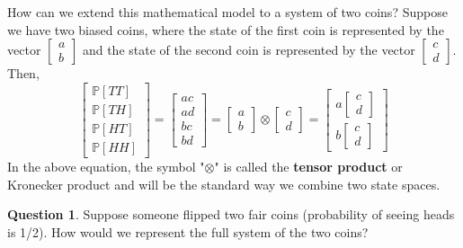 \documentclass[letterpaper, 12pt]{article}
\newcommand{\pr}{\mathbb{P}}	%
\newcommand{\1}{\mathds{1}}	%
\theoremstyle{definition}
\newtheorem{question}{Question}
\begin{document}
How can we extend this mathematical model to a system of two coins? Suppose we have two biased coins, where the state of the first coin is represented by the vector $\begin{bmatrix}
    a \\ b
\end{bmatrix}$ and the state of the second coin is represented by the vector $\begin{bmatrix}
    c \\ d
\end{bmatrix}$. Then, 
\begin{equation}
    \begin{bmatrix}
        \pr[TT] \\ \pr[TH] \\ \pr[HT] \\ \pr[HH] 
    \end{bmatrix} = \begin{bmatrix}
        ac \\ ad \\ bc \\ bd
    \end{bmatrix} = \begin{bmatrix}
        a \\ b
    \end{bmatrix} \otimes \begin{bmatrix}
        c \\ d
    \end{bmatrix} = \begin{bmatrix}
        a \begin{bmatrix}
            c \\ d
        \end{bmatrix} \\  b \begin{bmatrix}
            c \\ d
        \end{bmatrix}
    \end{bmatrix}
\end{equation}
In the above equation, the symbol "$\otimes$" is called the \textbf{tensor product} or Kronecker product and will be the standard way we combine two state spaces. 

\begin{question}
    Suppose someone flipped two fair coins (probability of seeing heads is 1/2). How would we represent the full system of the two coins?
\end{question}
\vspace{40mm} %
\end{document}
